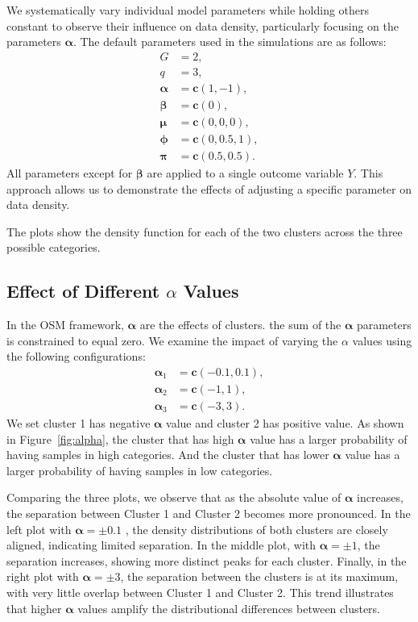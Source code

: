 \documentclass{article}
\begin{document}
We systematically vary individual model parameters while holding others constant to observe their influence on data density, particularly focusing on the parameters $\bm{\alpha}$. The default parameters used in the simulations are as follows:
\[
\begin{aligned}
G &= 2, \\
q &= 3, \\
\bm{\alpha} &= \mathbf{c}(1, -1), \\
\bm{\beta} &= \mathbf{c}(0), \\
\bm{\mu} &= \mathbf{c}(0, 0, 0), \\
\bm{\phi} &= \mathbf{c}(0, 0.5, 1), \\
\bm{\pi} &= \mathbf{c}(0.5, 0.5).
\end{aligned}
\]
All parameters except for $\bm{\beta}$ are applied to a single outcome variable $Y$. This approach allows us to demonstrate the effects of adjusting a specific parameter on data density.

The plots show the density function for each of the two clusters across the three possible categories.

\subsection{Effect of Different $\alpha$ Values}
In the OSM framework, $\bm{\alpha}$ are the effects of clusters. the sum of the $\bm{\alpha}$ parameters is constrained to equal zero. 
We examine the impact of varying the $\alpha$ values using the following configurations:
\[
\begin{aligned}
\bm{\alpha}_1 &= \mathbf{c}(-0.1, 0.1), \\
\bm{\alpha}_2 &= \mathbf{c}(-1, 1), \\ 
\bm{\alpha}_3 &= \mathbf{c}(-3, 3).
\end{aligned}
\]
We set cluster 1 has negative $\bm{\alpha}$ value and cluster 2 has positive value.
As shown in Figure~\ref{fig:alpha}, 
the cluster that has high $\bm{\alpha}$ value has a larger probability of having samples in high categories.
And the cluster that has lower $\bm{\alpha}$ value has a larger probability of having samples in low categories.

Comparing the three plots, we observe that as the absolute value of $\bm{\alpha}$ increases, the separation between Cluster 1 and Cluster 2 becomes more pronounced. In the left plot with $\bm{\alpha} = \pm 0.1$ , the density distributions of both clusters are closely aligned, indicating limited separation. In the middle plot, with $\bm{\alpha} = \pm 1$, the separation increases, showing more distinct peaks for each cluster. Finally, in the right plot with $\bm{\alpha} = \pm 3$, the separation between the clusters is at its maximum, with very little overlap between Cluster 1 and Cluster 2. This trend illustrates that higher $\bm{\alpha}$ values amplify the distributional differences between clusters.
\end{document}
